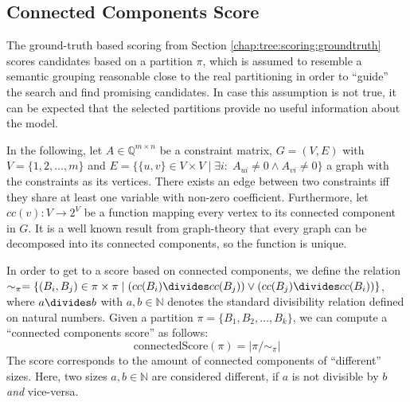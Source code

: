			\clearpage
	
		\subsection{Connected Components Score}
	
			The ground-truth based scoring from Section \ref{chap:tree:scoring:groundtruth} scores candidates based on a partition $\pi$, which is assumed to resemble a semantic grouping reasonable close to the real partitioning in order to \enquote{guide} the search and find promising candidates.
			In case this assumption is not true, it can be expected that the selected partitions provide no useful information about the model.
			
			In the following, let $A \in \mathbb{Q}^{m \times n}$ be a constraint matrix, $G = (V, E)$ with $V = \{ 1, 2, \ldots, m \}$ and $E = \{ \{ u, v \} \in V \times V \mid \exists i: \; A_{ui} \neq 0 \land A_{vi} \neq 0 \}$ a graph with the constraints as its vertices.
			There exists an edge between two constraints iff they share at least one variable with non-zero coefficient.
			Furthermore, let $cc(v): V \xrightarrow{} 2^V$ be a function mapping every vertex to its connected component in $G$.
			It is a well known result from graph-theory that every graph can be decomposed into its connected components, so the function is unique.
			
			In order to get to a score based on connected components, we define the relation $\sim_\pi = \{ (B_i, B_j) \in \pi \times \pi \mid (cc(B_i) \divides cc(B_j)) \lor (cc(B_j) \divides cc(B_i)) \}$, where $a \divides b$ with $a, b \in \mathbb{N}$ denotes the standard divisibility relation defined on natural numbers. 
			Given a partition $\pi = \{ B_1, B_2, \ldots, B_k \}$, we can compute a \enquote{connected components score} as follows:
			\begin{equation*}
				\mathrm{connectedScore}(\pi) = |\pi/\sim_\pi|				
			\end{equation*}
			The score corresponds to the amount of connected components of \enquote{different} sizes.
			Here, two sizes $a, b \in \mathbb{N}$ are considered different, if $a$ is not divisible by $b$ \textit{and} vice-versa.
			
			\clearpage
